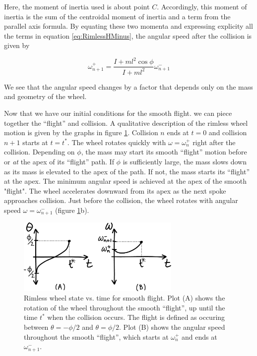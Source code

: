Here, the moment of inertia used is about point $C$. Accordingly, this moment of inertia is the sum of the centroidal moment of inertia and a term from the parallel axis formula. By equating these two momenta and expressing explicity all the terms in equation \ref{eq:RimlessHMinus}, the angular speed after the collision is given by

\begin{equation}
\omega_{n+1}^{+} = \frac{I + ml^{2} \cos{\phi}}{I + ml^2} \omega_{n+1}^{-}
\label{eq:RimlessOmegaPlus}
\end{equation}

We see that the angular speed changes by a factor that depends only on the mass
and geometry of the wheel.

Now that we have our initial conditions for the smooth flight. we can piece
together the ``flight'' and collision. A qualitative description of the rimless
wheel motion is given by the graphs in figure \ref{fig:RimlessPlots}. Collision
$n$ ends at $t = 0$ and collision $n+1$ starts at $t = t^*$. The wheel rotates
quickly with $\omega = \omega_{n}^{+}$ right after the collision. Depending on
$\phi$, the mass may start its smooth ``flight'' motion before or \emph{at} the
apex of its ``flight'' path. If $\phi$ is sufficiently large, the mass slows
down as its mass is elevated to the apex of the path. If not, the mass starts
its ``flight'' at the apex.  The minimum angular speed is achieved at the apex
of the smooth "flight". The wheel accelerates downward from its apex as the
next spoke approaches collision. Just before the collision, the wheel rotates
with angular speed $\omega = \omega_{n+1}^{-}$ (figure
\ref{fig:RimlessPlots}b).

\begin{figure}[h]		%
\begin{centering}
\includegraphics[width=0.7\textwidth]{Figures/RimlessPlots}\par
\end{centering}
\caption[Plot: Rimless Wheel State vs. Time for Smooth ``Flight'']{Rimless
wheel state vs. time for smooth flight. Plot (A) shows the rotation of the
wheel throughout the smooth ``flight'', up until the time $t^{*}$ when the
collision occurs. The flight is defined as occuring between $\theta = -\phi/2$
and $\theta = \phi/2$. Plot (B) shows the angular speed throughout the smooth
``flight'', which starts at $\omega_{n}^{+}$ and ends at $\omega_{n+1}^{-}$.}
\label{fig:RimlessPlots}
\end{figure}
%

